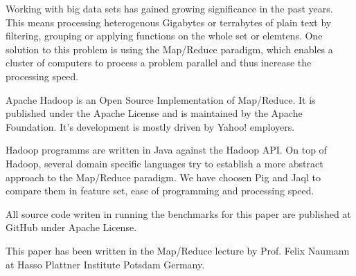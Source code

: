 Working with big data sets has gained growing significance in the past years. This means processing heterogenous Gigabytes or terrabytes of plain text by filtering, grouping or applying functions on the whole set or elemtens. One solution to this problem is using the Map/Reduce paradigm, which enables a cluster of computers to process a problem parallel and thus increase the processing speed.

Apache Hadoop is an Open Source Implementation of Map/Reduce. It is published under the Apache License and is maintained by the Apache Foundation. It's development is mostly driven by Yahoo! employers.

Hadoop programms are written in Java against the Hadoop API. On top of Hadoop, several domain specific languages try to establish a more abstract approach to the Map/Reduce paradigm. We have choosen Pig and Jaql to compare them in feature set, ease of programming and processing speed.

All source code writen in running the benchmarks for this paper are published at GitHub under Apache License.

This paper has been written in the Map/Reduce lecture by Prof. Felix Naumann at Hasso Plattner Institute Potsdam Germany.